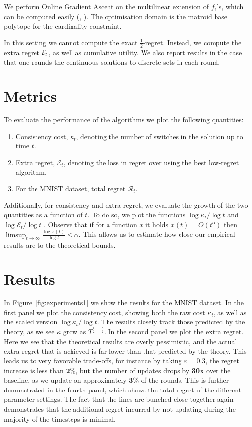 We perform Online Gradient Ascent on the multilinear extension of $f_e$'s, which can be computed easily (\cf, \citet[Appendix E.2]{Karimi2017}). The optimisation domain is the matroid base polytope for the cardinality constraint.

In this setting we cannot compute the exact  $\frac{1}{2}$-regret. Instead, we compute the extra regret $\mathcal{E}_t$, as well as cumulative utility. We also report results in the case that one rounds the continuous solutions to discrete sets in each round. 

\section{Metrics}
To evaluate the performance of the algorithms we plot the following quantities:
\begin{enumerate}\itemsep=0in
\item Consistency cost, $\kappa_t$, denoting the number of switches in the solution up to time $t$. 
\item Extra regret, $\mathcal{E}_t$, denoting the loss in regret over using the best low-regret algorithm. 
\item For the MNIST dataset, total regret $\mathcal{R}_t$.
\end{enumerate}

Additionally, for consistency and extra regret, we evaluate the growth of the two quantities as a function of $t$. To do so, we plot the functions $\log \kappa_t / \log t$ and $\log \mathcal{E}_t / \log t$ . Observe that if for a function $x$ it holds $x(t) = O(t^{\alpha})$ then $\limsup_{t\to\infty} \frac{\log x(t)}{\log t} \leq \alpha$. This allows us to estimate how close our empirical results are to the theoretical bounds. 

\section{Results}
In Figure~\ref{fig:experiments1} we show the results for the MNIST dataset. In the first panel we plot the consistency cost, showing both the raw cost $\kappa_t$, as well as the scaled version $\log \kappa_t / \log t$. The results closely track those predicted by the theory, as we see $\kappa$ grow as $T^{\frac{1}{2} + \frac{\epsilon}{2}}$. In the second panel we plot the extra regret. Here we see that the theoretical results are overly pessimistic, and the actual extra regret that is achieved is far lower than that predicted by the theory. This leads us to very favorable trade-offs, for instance by taking $\varepsilon=0.3$, the regret increase is less than $\mathbf{2\%}$, but the number of updates drops by \textbf{30x} over the baseline, as we update on approximately $\mathbf{3\%}$ of the rounds. This is further demonstrated in the fourth panel, which shows the total regret of the different parameter settings. The fact that the lines are bunched close together again demonstrates that the additional regret incurred by not updating during the majority of the timesteps is minimal. 

